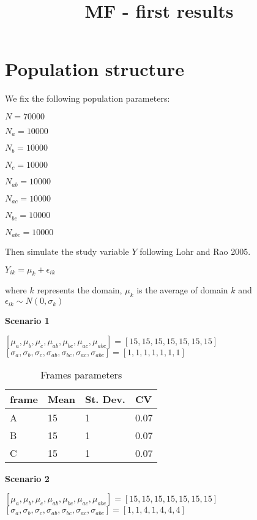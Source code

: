 \documentclass[11pt,a4paper]{article}
\begin{document}
\title{MF - first results}
\date{}
\maketitle


\section{Population structure}

We fix the following population parameters:

$N = 70000$

$N_a = 10000$

$N_b = 10000$

$N_c = 10000$

$N_{ab} = 10000$

$N_{ac} = 10000$

$N_{bc} = 10000$

$N_{abc} = 10000$

Then simulate the study variable $Y$ following Lohr and Rao 2005.

$Y_{ik} = \mu_k + \epsilon_{ik}$

where $k$ represents the domain, $\mu_k$ is the average of domain $k$ and $\epsilon_{ik} \sim N(0, \sigma_k)$


\textbf{Scenario 1}

$[\mu_a, \mu_b, \mu_c, \mu_{ab}, \mu_{bc}, \mu_{ac}, \mu_{abc}] = [15, 15, 15, 15, 15, 15, 15]$ \\ $[\sigma_a, \sigma_b, \sigma_c, \sigma_{ab}, \sigma_{bc}, \sigma_{ac}, \sigma_{abc}] = [1,1,1,1,1,1,1]$  


\begin{table}[]
\centering
\caption{Frames parameters}
\label{my-label}
\begin{tabular}{l|lll}
\hline
frame & Mean & St. Dev. & CV \\
\hline
A & 15 & 1 & 0.07  \\
B & 15 & 1 & 0.07 \\
C & 15 & 1 & 0.07 \\
\end{tabular}
\end{table}


\textbf{Scenario 2}
 
$[\mu_a, \mu_b, \mu_c, \mu_{ab}, \mu_{bc}, \mu_{ac}, \mu_{abc}] = [15, 15, 15, 15, 15, 15, 15]$     \\
$[\sigma_a, \sigma_b, \sigma_c, \sigma_{ab}, \sigma_{bc}, \sigma_{ac}, \sigma_{abc}] = [1,1,4,1,4,4,4]$ 
\end{document}
